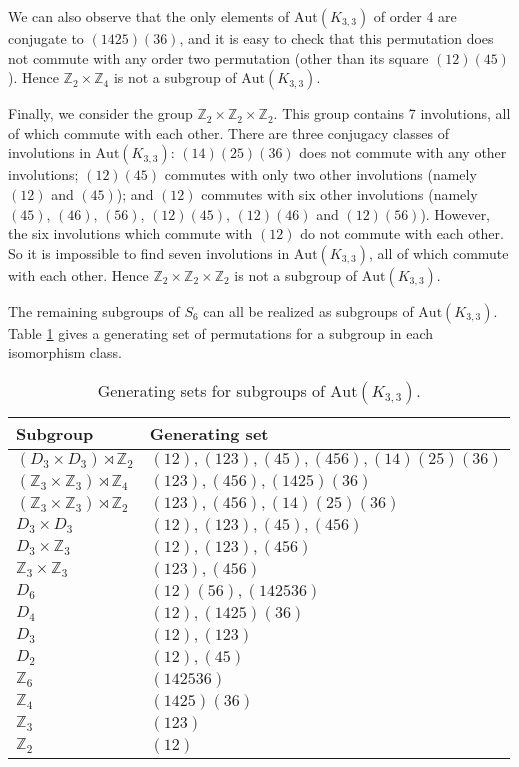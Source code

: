 \documentclass[11]{amsart}
\def\Z{\mathbb{Z}}
\newcommand{\semi}{{\rtimes}}
\def\Aut{{\mathrm{Aut}}}
\theoremstyle{definition}
\theoremstyle{remark}
\begin{document}
We can also observe that the only elements of $\Aut(K_{3,3})$ of order 4 are conjugate to $(1425)(36)$, and it is easy to check that this permutation does not commute with any order two permutation (other than its square $(12)(45)$).  Hence $\Z_2 \times \Z_4$ is not a subgroup of $\Aut(K_{3,3})$.

Finally, we consider the group $\Z_2 \times \Z_2 \times \Z_2$.  This group contains 7 involutions, all of which commute with each other.  There are three conjugacy classes of involutions in $\Aut(K_{3,3})$: $(14)(25)(36)$ does not commute with any other involutions; $(12)(45)$ commutes with only two other involutions (namely $(12)$ and $(45)$); and $(12)$ commutes with six other involutions (namely $(45)$, $(46)$, $(56)$, $(12)(45)$, $(12)(46)$ and $(12)(56)$).  However, the six involutions which commute with $(12)$ do not commute with each other.  So it is impossible to find seven involutions in $\Aut(K_{3,3})$, all of which commute with each other.  Hence $\Z_2 \times \Z_2 \times \Z_2$ is not a subgroup of $\Aut(K_{3,3})$.

The remaining subgroups of $S_6$ can all be realized as subgroups of $\Aut(K_{3,3})$.  Table \ref{Ta:K33} gives a generating set of permutations for a subgroup in each isomorphism class.

\begin{table}[htbp]
\begin{center}
\begin{tabular}{|l|l|}
\hline
Subgroup & Generating set \\ \hline
$(D_3 \times D_3) \semi \Z_2$ & $ (12), (123), (45), (456), (14)(25)(36) $ \\
$(\Z_3 \times \Z_3) \semi \Z_4$ & $ (123), (456), (1425)(36) $\\
$(\Z_3\times \Z_3) \semi \Z_2$ & $ (123), (456), (14)(25)(36) $\\
$D_3 \times D_3$ & $ (12), (123), (45), (456) $\\
$D_3 \times \Z_3$ & $ (12), (123), (456) $ \\
$\Z_3 \times \Z_3$ & $ (123), (456) $ \\
$D_6$ & $ (12)(56), (142536)$ \\
$D_4$ & $ (12), (1425)(36)$ \\
$D_3$ & $ (12), (123) $ \\
$D_2$ & $ (12), (45) $ \\
$\Z_6$ & $ (142536) $ \\
$\Z_4$ & $ (1425)(36) $ \\
$\Z_3$ & $ (123) $ \\
$\Z_2$ & $ (12) $ \\ \hline
\end{tabular}
\end{center}
\caption{Generating sets for subgroups of $\Aut(K_{3,3})$.}
\label{Ta:K33}
\end{table} 
\end{document}

